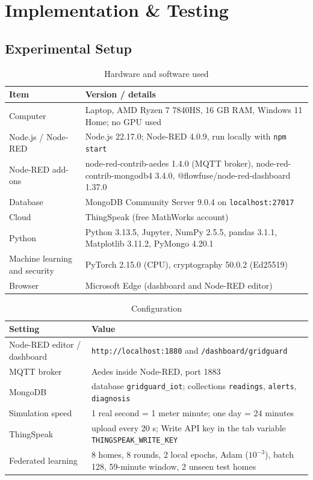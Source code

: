 \documentclass[12pt,a4paper,oneside]{report}
\begin{document}
\chapter{Implementation \& Testing}

\section{Experimental Setup}

\begin{table}[H]
\centering
\caption{Hardware and software used}
\label{tab:setup}
\small
\begin{tabularx}{\textwidth}{>{\raggedright\arraybackslash}p{4.2cm} L}
\toprule
\textbf{Item} & \textbf{Version / details}\\
\midrule
Computer & Laptop, AMD Ryzen 7 7840HS, 16 GB RAM, Windows 11 Home; no GPU used \\
Node.js / Node-RED & Node.js 22.17.0; Node-RED 4.0.9, run locally with \texttt{npm start} \\
Node-RED add-ons & node-red-contrib-aedes 1.4.0 (MQTT broker), node-red-contrib-mongodb4 3.4.0, @flowfuse/node-red-dashboard 1.37.0 \\
Database & MongoDB Community Server 9.0.4 on \texttt{localhost:27017} \\
Cloud & ThingSpeak (free MathWorks account) \\
Python & Python 3.13.5, Jupyter, NumPy 2.5.5, pandas 3.1.1, Matplotlib 3.11.2, PyMongo 4.20.1 \\
Machine learning and security & PyTorch 2.15.0 (CPU), cryptography 50.0.2 (Ed25519) \\
Browser & Microsoft Edge (dashboard and Node-RED editor) \\
\bottomrule
\end{tabularx}
\end{table}

\begin{table}[H]
\centering
\caption{Configuration}
\label{tab:config}
\small
\begin{tabularx}{\textwidth}{>{\raggedright\arraybackslash}p{4.2cm} L}
\toprule
\textbf{Setting} & \textbf{Value}\\
\midrule
Node-RED editor / dashboard & \texttt{http://localhost:1880} and \texttt{/dashboard/gridguard} \\
MQTT broker & Aedes inside Node-RED, port 1883 \\
MongoDB & database \texttt{gridguard\_iot}; collections \texttt{readings}, \texttt{alerts}, \texttt{diagnosis} \\
Simulation speed & 1 real second = 1 meter minute; one day = 24 minutes \\
ThingSpeak & upload every 20 s; Write API key in the tab variable \texttt{THINGSPEAK\_WRITE\_KEY} \\
Federated learning & 8 homes, 8 rounds, 2 local epochs, Adam ($10^{-3}$), batch 128, 59-minute window, 2 unseen test homes \\
\bottomrule
\end{tabularx}
\end{table}
\end{document}
